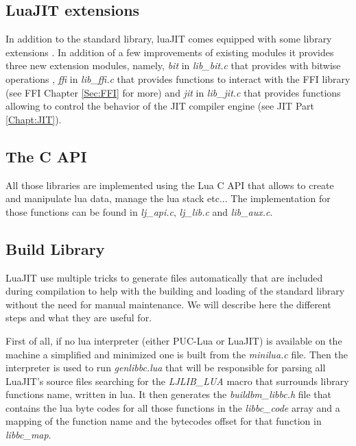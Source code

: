 \subsection{LuaJIT extensions}
\label{Subsec:lj-extensions}

In addition to the standard library, luaJIT comes equipped with some library
extensions \cite{extensions}. In addition of a few improvements of existing
modules it provides three new extension modules, namely, \emph{bit} in
\emph{lib\_bit.c} that provides with bitwise operations \cite{bitOp}, \emph{ffi}
in \emph{lib\_ffi.c} that provides functions to interact with the FFI library
(see FFI Chapter \ref{Sec:FFI} for more) and \emph{jit} in \emph{lib\_jit.c}
that provides functions allowing to control the behavior of the JIT compiler
engine (see JIT Part \ref{Chapt:JIT}).


\subsection{The C API}
\label{Subsec:c-api}

All those libraries are implemented using the Lua C API that allows to create
and manipulate lua data, manage the lua stack etc... The implementation for those
functions can be found in \emph{lj\_api.c}, \emph{lj\_lib.c} and \emph{lib\_aux.c}.


\subsection{Build Library}
\label{Subsec:build-lib}

LuaJIT use multiple tricks to generate files automatically that are included
during compilation to help with the building and loading of the standard library
without the need for manual maintenance. We will describe here the different
steps and what they are useful for.

First of all, if no lua interpreter
(either PUC-Lua or LuaJIT) is available on the machine a simplified and
minimized one is built from the \emph{minilua.c} file. Then the interpreter is
used to run \emph{genlibbc.lua} that will be responsible for parsing all LuaJIT's
source files searching for the \emph{LJLIB\_LUA} macro that surrounds library
functions name, written in lua. It then generates the \emph{buildbm\_libbc.h}
file that contains the lua byte codes for all those functions in the
\emph{libbc\_code} array and a mapping of the function name and the bytecodes
offset for that function in \emph{libbc\_map}.

